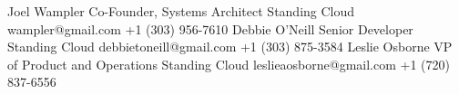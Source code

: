 
\begin{referees}
		{Joel Wampler}
		{Co-Founder, Systems Architect}
		{Standing Cloud}
		{wampler@gmail.com}
    {+1 (303) 956-7610}
    {Debbie O'Neill}
    {Senior Developer}
    {Standing Cloud}
    {debbietoneill@gmail.com}
    {+1 (303) 875-3584}
    {Leslie Osborne}
    {VP of Product and Operations}
    {Standing Cloud}
    {leslieaosborne@gmail.com}
    {+1 (720) 837-6556}
\end{referees}
